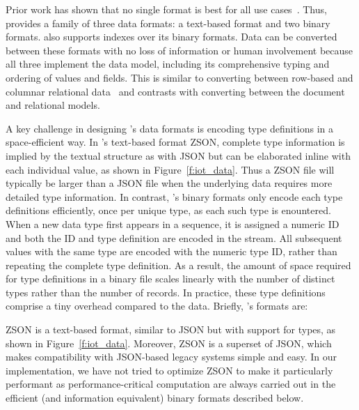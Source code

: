 Prior work has shown that no single format is best for all use cases~. Thus, \sys{} provides a family of three data formats: a text-based format and two binary formats. \sys{} also supports indexes over its binary formats. Data can be converted between these formats with no loss of information or human involvement because all three implement the \sys{} data model, including its comprehensive typing and ordering of values and fields. This is similar to converting between row-based and columnar relational data~\cite{h2o, peloton} and contrasts with converting between the document and relational models.

A key challenge in designing \sys{}'s data formats is encoding type definitions in a space-efficient way. In \sys{}'s text-based format ZSON, complete type information is implied by the textual structure as with JSON but can be elaborated inline with each individual value, as shown in Figure~\ref{f:iot_data}. Thus a ZSON file will typically be larger than a JSON file when the underlying data requires more detailed type information. In contrast, \sys{}'s binary formats only encode each type definitions efficiently, once per unique type, as each such type is enountered. When a new data type first appears in a sequence, it is assigned a numeric ID and both the ID and type definition are encoded in the stream. All subsequent values with the same type are encoded with the numeric type ID, rather than repeating the complete type definition. As a result, the amount of space required for type definitions in a binary \sys{} file scales linearly with the number of distinct types rather than the number of records. In practice, these type definitions comprise a tiny overhead compared to the data.  Briefly, \sys{}'s formats are:

 ZSON is a text-based format, similar to JSON but with support for types, as shown in Figure~\ref{f:iot_data}.  Moreover, ZSON is a superset of JSON, which makes compatibility with JSON-based legacy systems simple and easy.  In our implementation, we have not tried to optimize ZSON to make it particularly performant as performance-critical computation are always carried out in the efficient (and information equivalent) binary formats described below.

